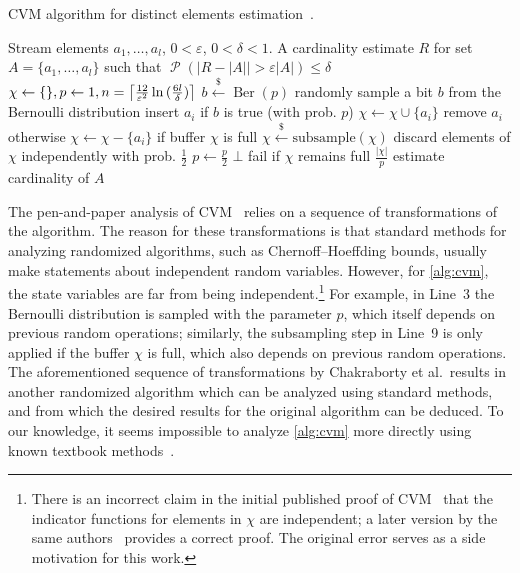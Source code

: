 \documentclass[a4paper,UKenglish,cleveref, autoref, thm-restate]{lipics-v2021}
\newcommand{\getsr}{\xleftarrow{\$}}
\DeclarePairedDelimiter{\ceil}{\lceil}{\rceil}
\DeclareMathOperator{\Ber}{\mathrm{Ber}}
\DeclareMathOperator{\prob}{\mathcal P}
\begin{document}
\begin{algorithm}[h!]
	\caption{CVM algorithm for distinct elements estimation~\cite{chakraborty2022}.}\label{alg:cvm}
	\begin{algorithmic}[1]
  \Require Stream elements $a_1,\dots,a_l$, $0 < \varepsilon$, $0 < \delta < 1$.
  \Ensure A cardinality estimate $R$ for set $A = \{ a_1,\dots,a_l \}$ such that $\prob \left( |R - |A| | > \varepsilon |A| \right) \leq \delta$
  \State $\chi \gets \{\}, p \gets 1, n = \ceil*{\frac{12}{\varepsilon^2} \ln{(\frac{6l}{\delta})} }$
    \State $b \getsr \Ber(p)$ \Comment randomly sample a bit $b$ from the Bernoulli distribution
     \Comment insert $a_i$ if $b$ is true (with prob. $p$)
      \State $\chi \gets \chi \cup \{a_i\}$
    \Else \Comment remove $a_i$ otherwise
      \State $\chi \gets \chi - \{a_i\}$
    \EndIf
     \Comment if buffer $\chi$ is full
      \State $\chi \getsr \mathrm{subsample}(\chi)$ \Comment discard elements of $\chi$ independently with prob. $\frac{1}{2}$
      \State $p \gets \frac{p}{2}$
    \EndIf
      \Return $\bot$ \Comment fail if $\chi$ remains full
    \EndIf
  \EndFor
  \State \Return $\frac{|\chi|}{p}$ \Comment estimate cardinality of $A$
  \end{algorithmic}
\end{algorithm}

The pen-and-paper analysis of CVM~\cite{chakraborty2022,chakraborty2023} relies on a sequence of transformations of the algorithm.
The reason for these transformations is that standard methods for analyzing randomized algorithms, such as Chernoff--Hoeffding bounds, usually make statements about independent random variables.
However, for \cref{alg:cvm}, the state variables are far from being independent.\footnote{There is an incorrect claim in the initial published proof of CVM~\cite[Claim 6]{chakraborty2022} that the indicator functions for elements in $\chi$ are independent; a later version by the same authors~\cite{chakraborty2023} provides a correct proof.
The original error serves as a side motivation for this work.}
For example, in Line~3 the Bernoulli distribution is sampled with the parameter $p$, which itself depends on previous random operations; similarly, the subsampling step in Line~9 is only applied if the buffer $\chi$ is full, which also depends on previous random operations.
The aforementioned sequence of transformations by Chakraborty et al.~results in another randomized algorithm which can be analyzed using standard methods, and from which the desired results for the original algorithm can be deduced.
To our knowledge, it seems impossible to analyze \cref{alg:cvm} more directly using known textbook methods~\cite{alon2000,mitzenmacher2017,motwani1995}.
\end{document}
